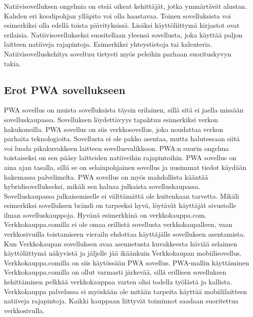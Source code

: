 \documentclass{tktltiki}
\begin{document}
Natiivisovelluksen ongelmia on etsiä oikeat kehittäjät, jotka ymmärtävät alustan. Kahden eri koodipohjan ylläpito voi olla haastavaa. Toinen sovelluksista voi esimerkiksi olla edellä toista päivityksissä. Lisäksi käyttöliittymä kirjastot ovat erilaisia. Natiivisovellukseksi suositellaan yleensä sovellusta, joka käyttää paljon laitteen natiiveja rajapintoja. Esimerkiksi yhteystietoja tai kalenteria. Natiivisovelluskehitys soveltuu tietysti myös peleihin parhaan suorituskyvyn takia. 

\subsection{Erot PWA sovellukseen}

PWA sovellus on muista sovelluksista täysin erilainen, sillä sitä ei jaella missään sovelluskaupassa. Sovelluksen löydettävyys tapahtuu esimerkiksi verkon hakukoneilla. PWA sovellus on siis verkkosovellus, joka noudattaa verkon parhaita teknologioita. Sovellusta ei ole pakko asentaa, mutta halutessaan siitä voi luoda pikakuvakkeen laitteen sovellusvalikkoon. PWA:n suurin ongelma toistaiseksi on sen pääsy laitteiden natiiveihin rajapintoihin. PWA sovellus on aina ajan tasalla, sillä se on selainpohjainen sovellus ja uusimmat tiedot käydään hakemassa palvelimelta. PWA sovellus on myös mahdollista kääntää hybridisovellukseksi, mikäli sen haluaa julkaista sovelluskaupassa. Sovelluskaupassa julkaisemiselle ei välttämättä ole kuitenkaan tarvetta. Mikäli esimerkiksi sovelluksen brändi on tarpeeksi hyvä, löytävät käyttäjät sivustolle ilman sovelluskauppoja. Hyvänä esimerkkinä on verkkokauppa.com. Verkkokauppa.comilla ei ole omaa erillistä sovellusta verkkokaupalleen, vaan verkkosivuilla toistamiseen vierailu ehdottaa käyttäjälle sovelluksen asentamista. Kun Verkkokaupan sovelluksen avaa asennetusta kuvakkeesta häviää selaimen käyttöliittymä näkyvistä ja jäljelle jää ikäänkuin Verkkokaupan mobiilisovellus. Verkkokauppa.comilla on siis käytössään PWA sovellus. PWA-mallin käyttäminen Verkkokauppa.comilla on ollut varmasti järkevää, sillä erillisen sovelluksen kehittäminen pelkkää verkkokauppaa varten olisi todella työlästä ja kallista. Verkkokauppa palvelussa ei myöskään ole mitään tarpeita käyttää mobiililaitteen natiiveja rajapintoja. Kaikki kauppaan liittyvät toiminnot saadaan suoritettua verkkosivulla.
\end{document}

